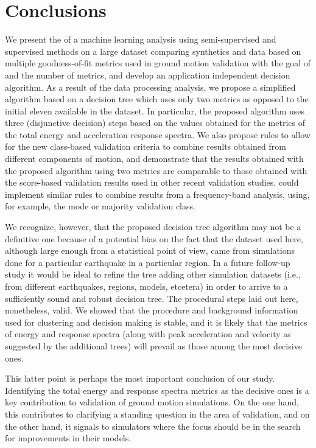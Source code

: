 
\section{Conclusions}

We present the  of a machine learning analysis using semi-supervised and supervised methods on a large dataset comparing synthetics and data based on multiple goodness-of-fit metrics used in ground motion validation with the goal of  and  the number of metrics, and develop an application independent decision algorithm. As a result of the data processing analysis, we propose a simplified algorithm based on a decision tree which uses only two metrics as opposed to the initial eleven available in the dataset. In particular, the proposed algorithm uses three (disjunctive decision) steps based on the values obtained for the metrics of the total energy and acceleration response spectra. We also propose rules to allow for the new class-based validation criteria to combine results obtained from different components of motion, and demonstrate that the results obtained with the proposed algorithm using two metrics are comparable to those obtained with the score-based validation results used in other recent validation studies.  could implement similar rules to combine results from a frequency-band analysis, using, for example, the mode or majority validation class. 

We recognize, however, that the proposed decision tree algorithm may not be a definitive one because of a potential bias on the fact that the dataset used here, although large enough from a statistical point of view, came from simulations done for a particular earthquake  in a particular region. In a future follow-up study it would be ideal to refine the tree adding other simulation datasets (i.e., from different earthquakes, regions, models,  etcetera) in order to arrive to a sufficiently sound and robust decision tree. The procedural steps laid out here, nonetheless,  valid. We showed that the procedure and background information used for clustering and decision making is stable, and it is likely that the metrics of energy and response spectra (along with peak acceleration and velocity as suggested by the additional trees) will prevail as those among the most decisive ones.

This latter point is perhaps the most important conclusion of our study. Identifying the total energy and response spectra metrics as the decisive ones is a key contribution to validation of ground motion simulations. On the one hand, this contributes to clarifying a standing question in the area of validation, and on the other hand, it signals to simulators where the focus should be in the search for improvements in their models.
